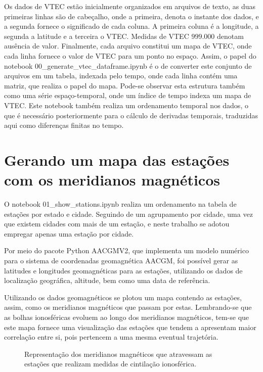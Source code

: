 Os dados de VTEC estão inicialmente organizados em arquivos de texto, as duas primeiras linhas são de cabeçalho, onde a primeira, denota o instante dos dados, e a segunda fornece o significado de cada coluna. A primeira coluna é a longitude, a segunda a latitude e a terceira o VTEC. Medidas de VTEC $999.000$ denotam ausência de valor. Finalmente, cada arquivo constitui um mapa de VTEC, onde cada linha fornece o valor de VTEC para um ponto no espaço. Assim, o papel do notebook 00\_generate\_vtec\_dataframe.ipynb é o de converter este conjunto de arquivos em um tabela, indexada pelo tempo, onde cada linha contém uma matriz, que realiza o papel do mapa. Pode-se observar esta estrutura também como uma série espaço-temporal, onde um índice de tempo indexa um mapa de VTEC. Este notebook também realiza um ordenamento temporal nos dados, o que é necessário posteriormente para o cálculo de derivadas temporais, traduzidas aqui como diferenças finitas no tempo.

\section{Gerando um mapa das estações com os meridianos magnéticos} 

O notebook 01\_show\_stations.ipynb realiza um ordenamento na tabela de estações por estado e cidade. Seguindo de um agrupamento por cidade, uma vez que existem cidades com mais de um estação, e neste trabalho se adotou empregar apenas uma estação por cidade. 

Por meio do pacote Python AACGMV2, que implementa um modelo numérico para o sistema de coordenadas geomagnética AACGM, foi possível gerar as latitudes e longitudes geomagnéticas para as estações, utilizando os dados de localização geográfica, altitude, bem como uma data de referência.

Utilizando os dados geomagnéticos se plotou um mapa contendo as estações, assim, como os meridianos magnéticos que passam por estas. Lembrando-se que as bolhas ionosféricas evoluem ao longo dos meridianos magnéticos, tem-se que este mapa fornece uma visualização das estações que tendem a apresentam maior correlação entre si, pois pertencem a uma mesma eventual trajetória.

\begin{figure}[H]
\centering
\makebox[\textwidth][c]{}
\label{fig:mapstations}
\caption{Representação dos meridianos magnéticos que atravessam as estações que realizam medidas de cintilação ionosférica.}
\end{figure}

